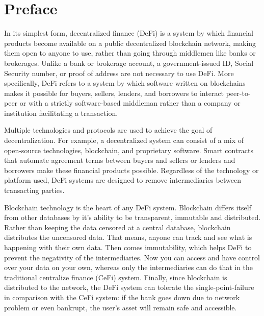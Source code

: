 \chapter*{Preface}
\thispagestyle{fancy}
\label{preface}
\hspace*{5cm}

In its simplest form, decentralized finance (DeFi) is a system by which financial products become available on a public decentralized blockchain network, making them open to anyone to use, rather than going through middlemen like banks or brokerages. Unlike a bank or brokerage account, a government-issued ID, Social Security number, or proof of address are not necessary to use DeFi. More specifically, DeFi refers to a system by which software written on blockchains makes it possible for buyers, sellers, lenders, and borrowers to interact peer-to-peer or with a strictly software-based middleman rather than a company or institution facilitating a transaction.

Multiple technologies and protocols are used to achieve the goal of decentralization. For example, a decentralized system can consist of a mix of open-source technologies, blockchain, and proprietary software. Smart contracts that automate agreement terms between buyers and sellers or lenders and borrowers make these financial products possible. Regardless of the technology or platform used, DeFi systems are designed to remove intermediaries between transacting parties.

Blockchain technology is the heart of any DeFi system. Blockchain differs itself from other databases by it's ability to be transparent, immutable and distributed. Rather than keeping the data censored at a central database, blockchain distributes the uncensored data. That means, anyone can track and see what is happening with their own data. Then comes immutability, which helps DeFi to prevent the negativity of the intermediaries. Now you can access and have control over your data on your own, whereas only the intermediaries can do that in the traditional centralize finance (CeFi) system. Finally, since blockchain is distributed to the network, the DeFi system can tolerate the single-point-failure in comparison with the CeFi system: if the bank goes down due to network problem or even bankrupt, the user's asset will remain safe and accessible.

